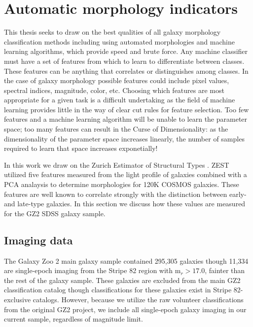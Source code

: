 
\section{Automatic morphology indicators}
This thesis seeks to draw on the best qualities of all galaxy morphology classification methods including using automated morphologies and machine learning algorithms, which provide speed and brute force. Any machine classifier must have a set of features from which to learn to differentiate between classes. These features can be anything that correlates or distinguishes among classes. In the case of galaxy morphology possible features could include pixel values, spectral indices, magnitude, color, etc. Choosing which features are most appropriate for a given task is a difficult undertaking as the field of machine learning provides little in the way of clear cut rules for feature selection. Too few features and a machine learning algorithm will be unable to learn the parameter space; too many features can result in the Curse of Dimensionality: as the dimensionality of the parameter space increases linearly, the number of samples required to learn that space increases exponetially! 

In this work we draw on the Zurich Estimator of Structural Types \citep[ZEST,][]{Scarlata2007}. ZEST utilized five features measured from the light profile of galaxies combined with a PCA analaysis to determine morphologies for 120K COSMOS galaxies. These features are well known to correlate strongly with the distinction between early- and late-type galaxies. In this section we discuss how these values are measured for the GZ2 SDSS galaxy sample. 

\subsection{Imaging data}
The Galaxy Zoo 2 main galaxy sample contained 295,305 galaxies though 11,334 are single-epoch imaging from the Stripe 82 region with m$_r > 17.0$, fainter than the rest of the galaxy sample. These galaxies are excluded from the main GZ2 classification catalog though classifications for these galaxies exist in Stripe 82-exclusive catalogs. However, because we utilize the raw volunteer classifications from the original GZ2 project, we include all single-epoch galaxy imaging in our current sample, regardless of magnitude limit.  

